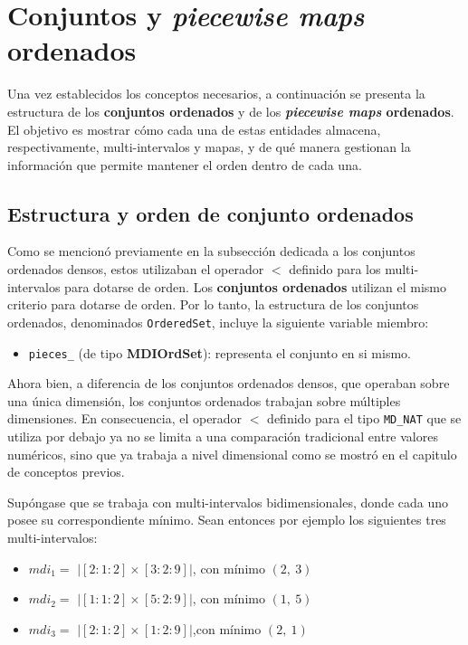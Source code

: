 \chapter{Conjuntos y \textit{piecewise maps} ordenados}

Una vez establecidos los conceptos necesarios, a continuación se presenta la estructura de los \textbf{conjuntos ordenados} y de los \textbf{\textit{piecewise maps} ordenados}. El objetivo es mostrar cómo cada una de estas entidades almacena, respectivamente, multi-intervalos y mapas, y de qué manera gestionan la información que permite mantener el orden dentro de cada una.

\section{Estructura y orden de conjunto ordenados}

Como se mencionó previamente en la subsección dedicada a los conjuntos ordenados densos, estos utilizaban el operador $<$ definido para los multi-intervalos para dotarse de orden. Los \textbf{conjuntos ordenados} utilizan el mismo criterio para dotarse de orden. Por lo tanto, la estructura de los conjuntos ordenados, denominados \texttt{OrderedSet}, incluye la siguiente variable miembro:

\begin{itemize}
  \item \texttt{pieces\_} (de tipo \textbf{MDIOrdSet}): representa el conjunto en si mismo.
\end{itemize}

Ahora bien, a diferencia de los conjuntos ordenados densos, que operaban sobre una única dimensión, los conjuntos ordenados trabajan sobre múltiples dimensiones. En consecuencia, el operador $<$ definido para el tipo \texttt{MD\_NAT} que se utiliza por debajo ya no se limita a una comparación tradicional entre valores numéricos, sino que ya trabaja a nivel dimensional como se mostró en el capitulo de conceptos previos.

Supóngase que se trabaja con multi-intervalos bidimensionales, donde cada uno posee su correspondiente mínimo. Sean entonces por ejemplo los siguientes tres multi-intervalos:

\begin{itemize}
    \item $mdi_1 =$ $|[2:1:2]\times[3:2:9]|$, con mínimo $(2,\ 3)$
    \item $mdi_2 =$ $|[1:1:2]\times[5:2:9]|$, con mínimo $(1,\ 5)$
    \item $mdi_3 =$ $|[2:1:2]\times[1:2:9]|$,con mínimo $(2,\ 1)$
\end{itemize}

